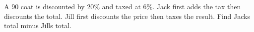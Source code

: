 A $90$ coat is discounted by $20\%$ and taxed at $6\%$. Jack first adds the tax then discounts the total. Jill first discounts the price then taxes the result. Find Jack\textquotesingle s total minus Jill\textquotesingle s total.
